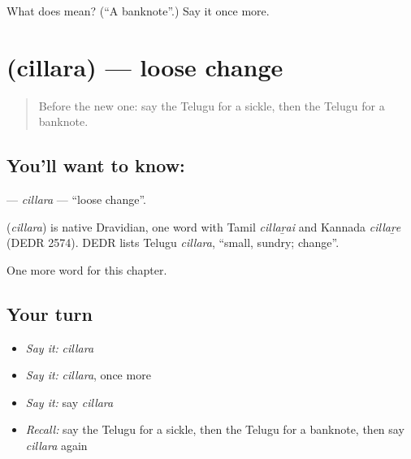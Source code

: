 \begin{tcolorbox}[breakable,colback=teal!4,colframe=teal!35!black,title={Before you move on}]
What does  mean? (\textquotedblleft{}A banknote\textquotedblright{}.) Say it once more.
\end{tcolorbox}
\section[\texorpdfstring{\te{చిల్లర} (cillara)}{చిల్లర (cillara)}]{ (cillara) — loose change}

\label{lesson:TE-C235-cillara}



\begin{quote}
Before the new one: say the Telugu for a sickle, then the Telugu for a banknote.
\end{quote}

\subsection*{You'll want to know: }
\textbf{} — \emph{cillara} — \textquotedblleft{}loose change\textquotedblright{}.

\begin{cousinweb}
\textbf{} (\emph{cillara}) is native Dravidian, one word with Tamil \emph{cillaṟai} and Kannada \emph{cillaṟe} (DEDR 2574). DEDR lists Telugu \emph{cillara}, \textquotedblleft{}small, sundry; change\textquotedblright{}.
\end{cousinweb}

\begin{grammarlens}[title={What you've built}]
One more word for this chapter.
\end{grammarlens}

\subsection*{Your turn}
\begin{itemize}
\raggedright
  \item \emph{Say it:} \emph{cillara}
  \item \emph{Say it:} \emph{cillara}, once more
  \item \emph{Say it:} say \emph{cillara}
  \item \emph{Recall:} say the Telugu for a sickle, then the Telugu for a banknote, then say \emph{cillara} again
\end{itemize}

